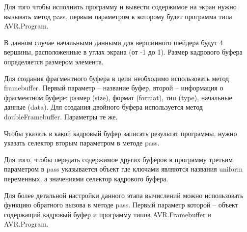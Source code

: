 Для того чтобы исполнить программу и вывести содержимое на экран нужно
вызывать метод pass, первым параметром к которому будет программа типа
AVR.Program.


В данном случае начальными данными для вершинного шейдера будут 4
вершины, расположенные в углах экрана (от -1 до 1). Размер кадрового
буфера определяется размером элемента.

Для создания фрагментного буфера в цепи необходимо использовать метод
framebuffer. Первый параметр -- название буфер, второй -- информация о 
фрагментном буфере: размер (size), формат (format), тип (type), начальные
данные (data). Для создания двойного буфера используется метод doubleFramebuffer.
Параметры те же.


Чтобы указать в какой кадровый буфер записать результат программы, нужно 
указать селектор вторым параметром в методе pass.


Для того, чтобы передать содержимое других буферов в программу третьим
параметром в pass указывается объект где ключами являются названия uniform
переменных, а значениями селектор кадрового буфера.


Для более детальной настройки данного этапа вычислений можно использовать
функцию обратного вызова в методе pass. Первый параметр которой -- объект
содержащий кадровый буфер и программу типов AVR.Framebuffer и AVR.Program.


